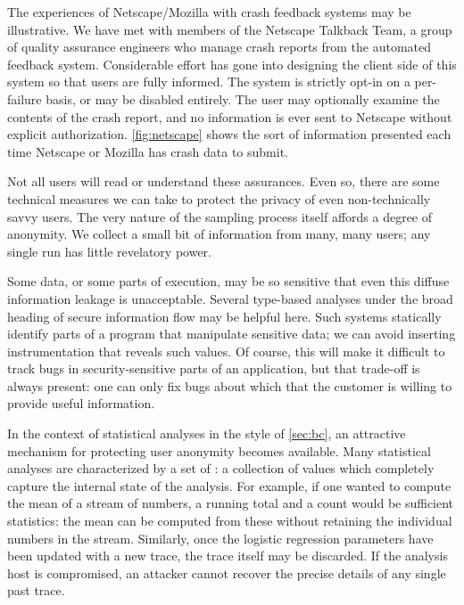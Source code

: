 The experiences of Netscape/Mozilla with crash feedback systems may be
illustrative.  We have met with members of the Netscape Talkback Team,
a group of quality assurance engineers who manage crash reports from
the automated feedback system.  Considerable effort has gone into
designing the client side of this system so that users are fully
informed.  The system is strictly opt-in on a per-failure basis, or
may be disabled entirely.  The user may optionally examine the
contents of the crash report, and no information is ever sent to
Netscape without explicit authorization.  \autoref{fig:netscape} shows
the sort of information presented each time Netscape or Mozilla has
crash data to submit.

Not all users will read or understand these assurances.
  Even so, there are some technical
measures we can take to protect the privacy of even non-technically
savvy users.  The very nature of the sampling process itself affords a
degree of anonymity.  We collect a small bit of information from many,
many users; any single run has little revelatory power. 

Some data, or some parts of execution, may be so sensitive that even
this diffuse information leakage is unacceptable.  Several type-based
analyses under the broad heading of secure information flow
\cite{1997:tapsoft:volpano,ZdZhNyMy2001} may be helpful here.  Such
systems statically identify parts of a program that manipulate
sensitive data; we can avoid inserting instrumentation that reveals
such values.  Of course, this will make it difficult to track bugs in
security-sensitive parts of an application, but that trade-off is
always present: one can only fix bugs about which that the customer is
willing to provide useful information.  

In the context of statistical analyses in the style of
\autoref{sec:bc}, an attractive mechanism for protecting user
anonymity becomes available.  Many statistical analyses are
characterized by a set of : a
collection of values which completely capture the internal state of
the analysis.  For example, if one wanted to compute the mean of a
stream of numbers, a running total and a count would be sufficient
statistics: the mean can be computed from these without retaining the
individual numbers in the stream.  Similarly, once the logistic
regression parameters have been updated with a new trace, the trace
itself may be discarded.  If the analysis host is compromised, an
attacker cannot recover the precise details of any single past trace.

